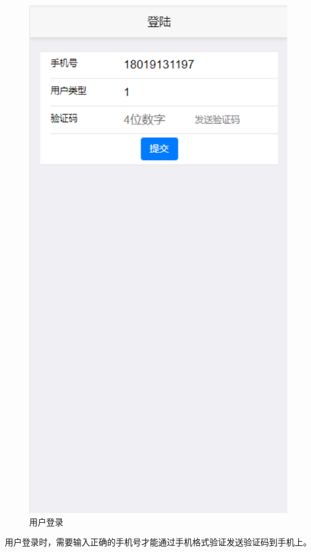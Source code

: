 \begin{figure}[ht]
    \centering
    \includegraphics{images/login.png}
    \caption{用户登录}
    \label{fig:login}
\end{figure} 
用户登录时，需要输入正确的手机号才能通过手机格式验证发送验证码到手机上。
 
